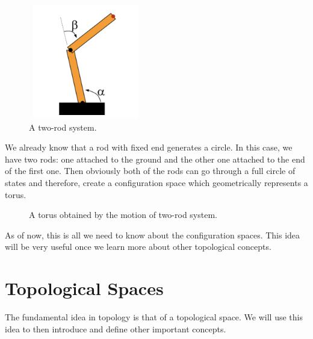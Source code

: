 \documentclass[a4paper, twocolumn]{article}
\theoremstyle{definition}
\begin{document}
\begin{figure}[H]
\centering
\includegraphics[width=5cm, height=5cm]{two-rod-system}
\caption*{A two-rod system.}
\end{figure}

We already know that a rod with fixed end generates a circle. In this case,
we have two rods: one attached to the ground and the other one attached to the end
of the first one. Then obviously both of the rods can go through a full circle
of states and therefore, create a configuration space which geometrically represents a torus.

\begin{figure}[H]
    \centering
    \caption*{A torus obtained by the motion of two-rod system.}
\end{figure}

As of now, this is all we need to know about the configuration spaces.
This idea will be very useful once we learn more about other topological concepts.


\section*{\centering Topological Spaces}
The fundamental idea in topology is that of a topological space.
We will use this idea to then introduce and define other important concepts.
\end{document}
